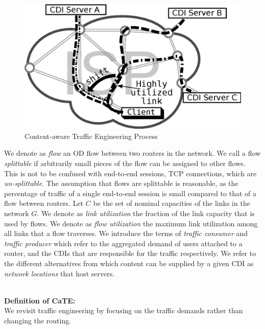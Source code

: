 \begin{figure}[tbp]
\center\includegraphics[width=0.90\linewidth]{figures/trafficShift-illustration.eps}
\caption{Content-aware Traffic Engineering Process}
\label{fig:Content-aware-illustration2}
\vspace{-1.5em}
\end{figure}


\smallskip
{}\label{sec:Terminology}
We denote as {\it flow} an OD flow between two routers in the network.  We call
a flow {\it splittable} if arbitrarily small pieces of the flow can be assigned
to other flows.  This is not to be confused with end-to-end sessions, \ie TCP
connections, which are \emph{un-splittable}.  The assumption that flows are
splittable is reasonable, as the percentage of traffic of a single end-to-end
session is small compared to that of a flow between routers. Let $C$ be the set
of nominal capacities of the links in the network $G$. We denote as {\it link
utilization} the fraction of the link capacity that is used by flows. We denote
as {\it flow utilization} the maximum link utilization among all links that a
flow traverses. We introduce the terms of {\it traffic consumer} and {\it
traffic producer} which refer to the aggregated demand of users attached to a
router, and the CDIs that are responsible for the traffic respectively. We
refer to the different alternatives from which content can be supplied by a
given CDI as \emph{network locations} that host servers.


\ \\\noindent\textbf{Definition of CaTE:}\label{sec:CaTE-Definitions}\\\noindent
We revisit traffic engineering by focusing on the traffic demands rather than
changing the routing.

